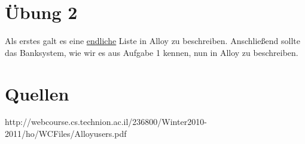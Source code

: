 \documentclass{fm}
\begin{document}
\section*{Übung 2}
Als erstes galt es eine \underline{endliche} Liste in Alloy zu beschreiben. Anschließend sollte das Banksystem, wie wir es aus Aufgabe 1 kennen, nun in Alloy zu beschreiben.

\section*{Quellen}
http://webcourse.cs.technion.ac.il/236800/Winter2010-2011/ho/WCFiles/Alloyusers.pdf
\end{document}
